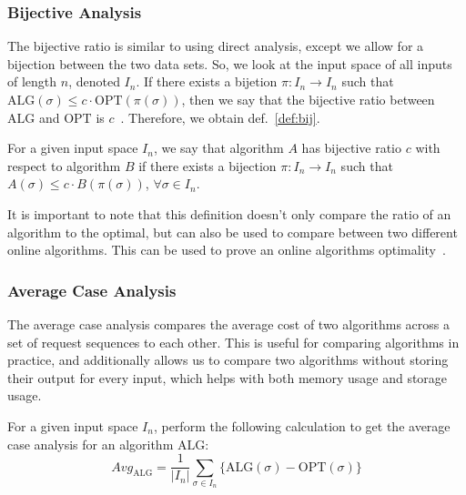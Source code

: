 \subsubsection*{Bijective Analysis}
\label{sec:Bij}
The bijective ratio is similar to using direct analysis, except we allow for a bijection between the two data sets. So, we look at the input space of all inputs of length $n$, denoted $I_n$. If there exists a bijetion $\pi:I_n \rightarrow I_n$ such that $\mathrm{ALG}(\sigma) \leq c\cdot \mathrm{OPT}(\pi(\sigma))$, then  we say that the bijective ratio between $\mathrm{ALG}$ and $\mathrm{OPT}$ is $c$~\cite{bij2016}. Therefore, we obtain def.~\ref{def:bij}. 

\begin{definition}
    \label{def:bij}
    For a given input space $I_n$, we say that algorithm $A$ has bijective ratio $c$ with respect to algorithm $B$ if there exists a bijection $\pi:I_n \rightarrow I_n$ such that $A(\sigma) \leq c\cdot B(\pi(\sigma))$, $\forall \sigma \in I_n$. 
\end{definition}

It is important to note that this definition doesn't only compare the ratio of an algorithm to the optimal, but can also be used to compare between two different online algorithms. This can be used to prove an online algorithms optimality~\cite{bij2016}.

\subsubsection*{Average Case Analysis}
\label{sec:Avg}
The average case analysis compares the average cost of two algorithms across a set of request sequences to each other. This is useful for comparing algorithms in practice, and additionally allows us to compare two algorithms without storing their output for every input, which helps with both memory usage and storage usage.

\begin{definition}
    \label{def:avg}
    For a given input space $I_n$, perform the following calculation to get the average case analysis for an algorithm $\mathrm{ALG}$: 
    \begin{equation*}
        Avg_{\mathrm{ALG}} = \frac{1}{|I_n|}\sum_{\sigma \in I_n} \{\mathrm{ALG}(\sigma) - \mathrm{OPT}(\sigma)\}
    \end{equation*}
\end{definition}